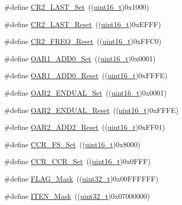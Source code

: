 \begin{DoxyCompactItemize}
\item 
\#define \hyperlink{group___i2_c___private___defines_ga3604dd2f23b0f15a088ef6fe9731485a}{C\+R2\+\_\+\+L\+A\+S\+T\+\_\+\+Set}~((\hyperlink{_p_e___types_8h_a1f1825b69244eb3ad2c7165ddc99c956}{uint16\+\_\+t})0x1000)
\item 
\#define \hyperlink{group___i2_c___private___defines_ga904e044226182269485936bad8314f84}{C\+R2\+\_\+\+L\+A\+S\+T\+\_\+\+Reset}~((\hyperlink{_p_e___types_8h_a1f1825b69244eb3ad2c7165ddc99c956}{uint16\+\_\+t})0x\+E\+F\+F\+F)
\item 
\#define \hyperlink{group___i2_c___private___defines_ga2bcf74bd8fc3aaa931faf750d1afe405}{C\+R2\+\_\+\+F\+R\+E\+Q\+\_\+\+Reset}~((\hyperlink{_p_e___types_8h_a1f1825b69244eb3ad2c7165ddc99c956}{uint16\+\_\+t})0x\+F\+F\+C0)
\item 
\#define \hyperlink{group___i2_c___private___defines_gaeb56bf422fd13e68c82783df63f425ab}{O\+A\+R1\+\_\+\+A\+D\+D0\+\_\+\+Set}~((\hyperlink{_p_e___types_8h_a1f1825b69244eb3ad2c7165ddc99c956}{uint16\+\_\+t})0x0001)
\item 
\#define \hyperlink{group___i2_c___private___defines_gac5c2ac4577b70e1d7618b7fa1d715e3a}{O\+A\+R1\+\_\+\+A\+D\+D0\+\_\+\+Reset}~((\hyperlink{_p_e___types_8h_a1f1825b69244eb3ad2c7165ddc99c956}{uint16\+\_\+t})0x\+F\+F\+F\+E)
\item 
\#define \hyperlink{group___i2_c___private___defines_ga859551657f688e5efdb3f573e78ee979}{O\+A\+R2\+\_\+\+E\+N\+D\+U\+A\+L\+\_\+\+Set}~((\hyperlink{_p_e___types_8h_a1f1825b69244eb3ad2c7165ddc99c956}{uint16\+\_\+t})0x0001)
\item 
\#define \hyperlink{group___i2_c___private___defines_gaae86eb7689c73e34388cfbd03b8d9ecd}{O\+A\+R2\+\_\+\+E\+N\+D\+U\+A\+L\+\_\+\+Reset}~((\hyperlink{_p_e___types_8h_a1f1825b69244eb3ad2c7165ddc99c956}{uint16\+\_\+t})0x\+F\+F\+F\+E)
\item 
\#define \hyperlink{group___i2_c___private___defines_ga243036db699954e290f48e6743323054}{O\+A\+R2\+\_\+\+A\+D\+D2\+\_\+\+Reset}~((\hyperlink{_p_e___types_8h_a1f1825b69244eb3ad2c7165ddc99c956}{uint16\+\_\+t})0x\+F\+F01)
\item 
\#define \hyperlink{group___i2_c___private___defines_ga3af49180596b283514782708ac85606e}{C\+C\+R\+\_\+\+F\+S\+\_\+\+Set}~((\hyperlink{_p_e___types_8h_a1f1825b69244eb3ad2c7165ddc99c956}{uint16\+\_\+t})0x8000)
\item 
\#define \hyperlink{group___i2_c___private___defines_ga07695fd4c06df54def77840118f83a0d}{C\+C\+R\+\_\+\+C\+C\+R\+\_\+\+Set}~((\hyperlink{_p_e___types_8h_a1f1825b69244eb3ad2c7165ddc99c956}{uint16\+\_\+t})0x0\+F\+F\+F)
\item 
\#define \hyperlink{group___i2_c___private___defines_ga2be62bf481cd44de9ab604efe5595ff6}{F\+L\+A\+G\+\_\+\+Mask}~((\hyperlink{_p_e___types_8h_a33594304e786b158f3fb30289278f5af}{uint32\+\_\+t})0x00\+F\+F\+F\+F\+F\+F)
\item 
\#define \hyperlink{group___i2_c___private___defines_gab99e12994e073c2a681a6cf68492b3e2}{I\+T\+E\+N\+\_\+\+Mask}~((\hyperlink{_p_e___types_8h_a33594304e786b158f3fb30289278f5af}{uint32\+\_\+t})0x07000000)
\end{DoxyCompactItemize}


